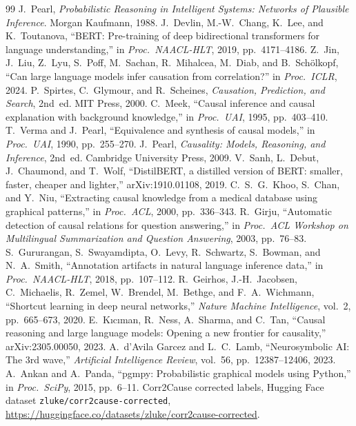 \documentclass[11pt,a4paper]{article}
\begin{document}
\begingroup
\small
\renewcommand{\refname}{References}
\begin{thebibliography}{99}\setlength{\itemsep}{2pt}
 J.~Pearl, \emph{Probabilistic Reasoning in Intelligent Systems: Networks of Plausible Inference}. Morgan Kaufmann, 1988.
 J.~Devlin, M.-W.~Chang, K.~Lee, and K.~Toutanova, ``BERT: Pre-training of deep bidirectional transformers for language understanding,'' in \emph{Proc.\ NAACL-HLT}, 2019, pp.~4171--4186.
 Z.~Jin, J.~Liu, Z.~Lyu, S.~Poff, M.~Sachan, R.~Mihalcea, M.~Diab, and B.~Sch\"olkopf, ``Can large language models infer causation from correlation?'' in \emph{Proc.\ ICLR}, 2024.
 P.~Spirtes, C.~Glymour, and R.~Scheines, \emph{Causation, Prediction, and Search}, 2nd~ed. MIT Press, 2000.
 C.~Meek, ``Causal inference and causal explanation with background knowledge,'' in \emph{Proc.\ UAI}, 1995, pp.~403--410.
 T.~Verma and J.~Pearl, ``Equivalence and synthesis of causal models,'' in \emph{Proc.\ UAI}, 1990, pp.~255--270.
 J.~Pearl, \emph{Causality: Models, Reasoning, and Inference}, 2nd~ed. Cambridge University Press, 2009.
 V.~Sanh, L.~Debut, J.~Chaumond, and T.~Wolf, ``DistilBERT, a distilled version of BERT: smaller, faster, cheaper and lighter,'' arXiv:1910.01108, 2019.
 C.~S.~G.~Khoo, S.~Chan, and Y.~Niu, ``Extracting causal knowledge from a medical database using graphical patterns,'' in \emph{Proc.\ ACL}, 2000, pp.~336--343.
 R.~Girju, ``Automatic detection of causal relations for question answering,'' in \emph{Proc.\ ACL Workshop on Multilingual Summarization and Question Answering}, 2003, pp.~76--83.
 S.~Gururangan, S.~Swayamdipta, O.~Levy, R.~Schwartz, S.~Bowman, and N.~A.~Smith, ``Annotation artifacts in natural language inference data,'' in \emph{Proc.\ NAACL-HLT}, 2018, pp.~107--112.
 R.~Geirhos, J.-H.~Jacobsen, C.~Michaelis, R.~Zemel, W.~Brendel, M.~Bethge, and F.~A.~Wichmann, ``Shortcut learning in deep neural networks,'' \emph{Nature Machine Intelligence}, vol.~2, pp.~665--673, 2020.
 E.~K{\i}c{\i}man, R.~Ness, A.~Sharma, and C.~Tan, ``Causal reasoning and large language models: Opening a new frontier for causality,'' arXiv:2305.00050, 2023.
 A.~d'Avila Garcez and L.~C.~Lamb, ``Neurosymbolic AI: The 3rd wave,'' \emph{Artificial Intelligence Review}, vol.~56, pp.~12387--12406, 2023.
 A.~Ankan and A.~Panda, ``pgmpy: Probabilistic graphical models using Python,'' in \emph{Proc.\ SciPy}, 2015, pp.~6--11.
 Corr2Cause corrected labels, Hugging Face dataset \texttt{zluke/corr2cause-corrected}, \url{https://huggingface.co/datasets/zluke/corr2cause-corrected}.
\end{thebibliography}
\endgroup
\end{document}
